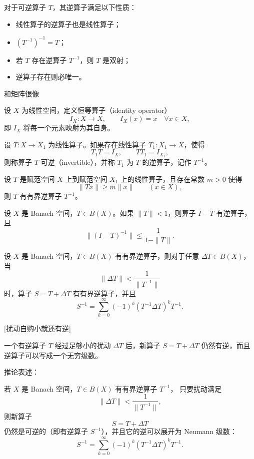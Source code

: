\begin{theorem}[逆算子的性质]
对于可逆算子 $T$，其逆算子满足以下性质：
\begin{itemize}
    \item[(1)] 线性算子的逆算子也是线性算子；
    \item[(2)] $\left(T^{-1}\right)^{-1} = T$；
    \item[(3)] 若 $T$ 存在逆算子 $T^{-1}$，则 $T$ 是双射；
    \item[(4)] 逆算子存在则必唯一。
\end{itemize}

\end{theorem}
\begin{note}
    和矩阵很像
\end{note}
\begin{definition}[恒等算子与逆算子]
设 $X$ 为线性空间，定义恒等算子（identity operator）
\[
I_X : X \to X, \qquad I_X(x) = x \quad \forall x \in X,
\]
即 $I_X$ 将每一个元素映射为其自身。

设 $T : X \to X_1$ 为线性算子。如果存在线性算子 $T_1 : X_1 \to X$，使得
\[
T_1 T = I_X, \qquad T T_1 = I_{X_1},
\]
则称算子 $T$ 可逆（invertible），并称 $T_1$ 为 $T$ 的逆算子，记作 $T^{-1}$。
\end{definition}
\begin{theorem}[有界逆算子]
设 $T$ 是赋范空间 $X$ 上到赋范空间 $X_1$ 上的线性算子，且存在常数 $m>0$ 使得
\[
\|Tx\| \ge m \|x\| \qquad (x \in X),
\]
则 $T$ 有有界逆算子 $T^{-1}$。
\end{theorem}

\begin{theorem}
设 $X$ 是 Banach 空间，$T \in B(X)$。如果 $\|T\| < 1$，则算子 $I - T$ 有逆算子，且
\[
\|(I - T)^{-1}\| \le \frac{1}{1 - \|T\|}.
\]
\end{theorem}
\newpage
\begin{corollary}
设 $X$ 是 Banach 空间，$T \in B(X)$ 有有界逆算子，则对于任意 $\Delta T \in B(X)$，当
\[
\|\Delta T\| < \frac{1}{\|T^{-1}\|}
\]
时，算子 $S = T + \Delta T$ 有有界逆算子，并且
\[
S^{-1} = \sum_{k = 0}^{\infty} (-1)^k \left( T^{-1} \Delta T \right)^k T^{-1}.
\]
\end{corollary}[扰动自购小就还有逆]
\begin{note}
    一个有逆算子 $T$ 经过足够小的扰动 $\Delta T$ 后，新算子 $S = T + \Delta T$ 仍然有逆，而且逆算子可以写成一个无穷级数。

推论表述：

若 $X$ 是 Banach 空间，$T \in B(X)$ 有有界逆算子 $T^{-1}$，
只要扰动满足
\[
\|\Delta T\| < \frac{1}{\|T^{-1}\|},
\]
则新算子
\[
S = T + \Delta T
\]
仍然是可逆的（即有逆算子 $S^{-1}$），并且它的逆可以展开为 Neumann 级数：
\[
S^{-1} = \sum_{k=0}^{\infty} (-1)^k (T^{-1} \Delta T)^k T^{-1}.
\]
\end{note}

